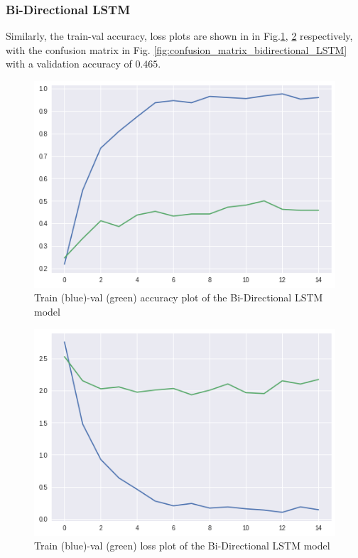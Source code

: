 \documentclass[conference]{IEEEtran}
\begin{document}
\subsubsection{Bi-Directional LSTM}
Similarly, the train-val accuracy, loss plots are shown in in Fig.\ref{fig:train_val_acc_bidirectional_LSTM}, \ref{fig:train_val_loss_bidirectional_LSTM} respectively, with the confusion matrix in Fig. \ref{fig:confusion_matrix_bidirectional_LSTM} with a validation accuracy of $0.465$.
\begin{figure}[H]
\begin{center}
\includegraphics[scale=0.4]{bidirectional_LSTM/bidirectionalLSTM_acc_plot.png}
\end{center}
\caption{\label{fig:train_val_acc_bidirectional_LSTM} 
Train (blue)-val (green) accuracy plot of the Bi-Directional LSTM model}
\end{figure}
\begin{figure}[H]
\begin{center}
\includegraphics[scale=0.4]{bidirectional_LSTM/bidirectionalLSTM_loss_plot.png}
\end{center}
\caption{\label{fig:train_val_loss_bidirectional_LSTM} 
Train (blue)-val (green) loss plot of the Bi-Directional LSTM model}
\end{figure}
\end{document}
